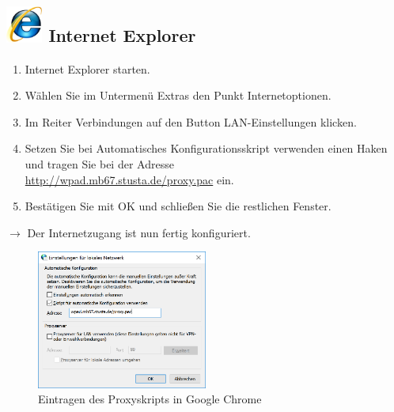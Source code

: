 \documentclass[a4paper,12pt]{scrartcl}
\begin{document}
\subsection*{\includegraphics[height=1.2cm,keepaspectratio]{Bilder/Internet_Explorer_7_Logo} Internet Explorer}
\begin{enumerate}
    \item Internet Explorer starten.
    \item Wählen Sie im Untermenü Extras den Punkt Internetoptionen.
    \item Im Reiter Verbindungen auf den Button LAN-Ein\-stellungen klicken.
    \item Setzen Sie bei Automatisches Konfigurationsskript verwenden einen Haken und tragen Sie bei der Adresse \\ \url{http://wpad.mb67.stusta.de/proxy.pac} ein.
    \item Bestätigen Sie mit OK und schließen Sie die restlichen Fenster.
\end{enumerate}
$\rightarrow$ Der Internetzugang ist nun fertig konfiguriert.


\newpage
\begin{figure}
  \vspace{-40pt}
  \begin{center}
    \includegraphics[width=0.5\textwidth,keepaspectratio]{Bilder/Proxy_IE_mb}
  \end{center}
  \caption{Eintragen des Proxyskripts in Google Chrome}
\end{figure}
\end{document}
